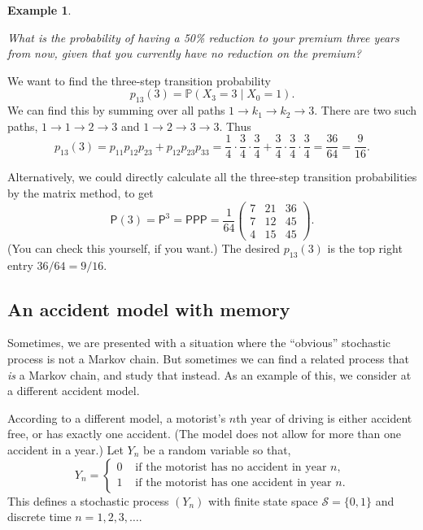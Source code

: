 \documentclass[
  a4paper,
]{article}
\theoremstyle{definition}
\theoremstyle{definition}
\newtheorem{example}{Example}[section]
\theoremstyle{definition}
\theoremstyle{remark}
\begin{document}
\begin{example}
\protect\hypertarget{exm:act1}{}\label{exm:act1}

\emph{What is the probability of having a 50\% reduction to your premium three years from now, given that you currently have no reduction on the premium?}

We want to find the three-step transition probability
\[
p_{13}(3) = \mathbb P(X_{3} = 3 \mid X_0=1) .
\]
We can find this by summing over all paths \(1 \to k_1 \to k_2 \to 3\). There are two such paths, \(1 \to 1 \to 2 \to 3\) and \(1 \to 2 \to 3 \to 3\). Thus
\[ p_{13}(3) = p_{11}p_{12}p_{23} + p_{12}p_{23}p_{33} = \frac14 \cdot\frac34 \cdot\frac34 + \frac34 \cdot\frac34 \cdot\frac34 = \frac{36}{64} = \frac{9}{16} . \]

Alternatively, we could directly calculate all the three-step transition probabilities by the matrix method, to get
\[ \mathsf P(3) = \mathsf P^3 = \mathsf{PPP} = \frac{1}{64} \begin{pmatrix} 7 & 21 & 36 \\ 7 & 12 & 45 \\ 4 & 15 & 45 \end{pmatrix} .\]
(You can check this yourself, if you want.) The desired \(p_{13}(3)\) is the top right entry \(36/64 = 9/16\).

\end{example}

\hypertarget{S06-example2}{%
\subsection{An accident model with memory}\label{S06-example2}}

Sometimes, we are presented with a situation where the ``obvious'' stochastic process is not a Markov chain. But sometimes we can find a related process that \emph{is} a Markov chain, and study that instead. As an example of this, we consider at a different accident model.

According to a different model, a motorist's \(n\)th year of driving is either accident free, or has exactly one accident. (The model does not allow for more than one accident in a year.) Let \(Y_n\) be a random variable so that,
\[
Y_n=\begin{cases}
0&\text{ if the motorist has no accident in year $n$,}\\
1&\text{ if the motorist has one accident in year $n$.}
\end{cases}
\]
This defines a stochastic process \((Y_n)\) with finite state space \(\mathcal{S}=\{0,1\}\) and discrete time \(n = 1,2,3,\dots\).
\end{document}
